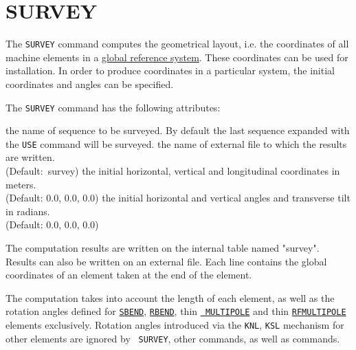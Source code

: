  
\chapter{SURVEY}
\label{chap:survey}

The \texttt{SURVEY} command computes the geometrical layout, i.e. the
coordinates of all machine elements in a 
\hyperref[sec:global-ref]{global reference system}. These
coordinates can be used for installation. In order to produce
coordinates in a particular system, the initial coordinates and angles
can be specified. 


The {\tt SURVEY} command has the following attributes:
\begin{madlist}
   the name of sequence to be surveyed. By default the
  last sequence expanded with the {\tt USE} command will be surveyed.  
    the name of external file to which the results are
  written.\\ (Default:~survey)
   the initial horizontal, vertical and longitudinal
  coordinates in meters.\\ (Default: 0.0, 0.0, 0.0) 
   the initial horizontal and vertical angles
  and transverse tilt in radians.\\ (Default: 0.0, 0.0, 0.0)
\end{madlist}

The computation results are written on the internal table named
"survey". Results can also be written on an external file. Each line
contains the global coordinates of an element taken at the end of the
element.

The computation takes into account the length of each element, as well
as the rotation angles defined for \hyperref[bend-sbend]{\tt SBEND},
\hyperref[bend-rbend]{\tt RBEND}, thin \hyperref[sec:multipole]{\tt
  MULTIPOLE} and thin \hyperref[sec:rfmultipole]{\tt RFMULTIPOLE}
elements exclusively.  Rotation angles introduced via the {\tt KNL},
{\tt KSL} mechanism for other elements are ignored by {\tt
  SURVEY}, other \madx commands, as well as \ptc commands.

